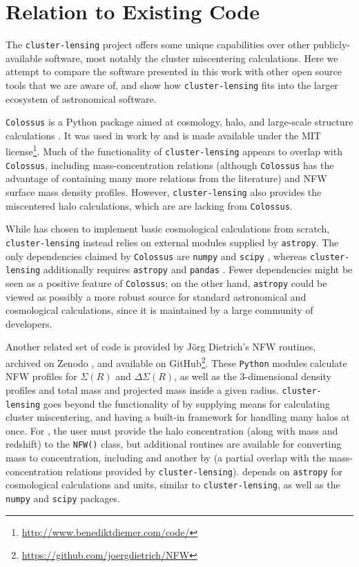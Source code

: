 \documentclass[twocolumn]{aastex6}
\newcommand{\code}{\lstinline[style=codeintext]}
\begin{document}
\section{Relation to Existing Code}

The \code{cluster-lensing} project offers some unique capabilities over other publicly-available software, most notably the cluster miscentering calculations. Here we attempt to compare the software presented in this work with other open source tools that we are aware of, and show how \code{cluster-lensing} fits into the larger ecosystem of astronomical software.

\code{Colossus} is a Python package aimed at cosmology, halo, and large-scale structure calculations \citep{ColossusCode}. It was used in work by \citet{Diemer15} and is made available under the MIT license\footnote{\url{http://www.benediktdiemer.com/code/}}. Much of the functionality of \code{cluster-lensing} appears to overlap with \code{Colossus}, including mass-concentration relations (although \code{Colossus} has the advantage of containing many more relations from the literature) and NFW surface mass density profiles. However, \code{cluster-lensing} also provides the miscentered halo calculations, which are are lacking from \code{Colossus}.

While \citet{ColossusCode} has chosen to implement basic cosmological calculations from scratch, \code{cluster-lensing} instead relies on external modules supplied by \code{astropy}.  The only dependencies claimed by \code{Colossus} are \code{numpy} \citep{NumPy} and \code{scipy} \citep{SciPy}, whereas \code{cluster-lensing} additionally requires \code{astropy} \citep{astropy13} and \code{pandas} \citep{Pandas}. Fewer dependencies might be seen as a positive feature of \code{Colossus}; on the other hand, \code{astropy} could be viewed as possibly a more robust source for standard astronomical and cosmological calculations, since it is maintained by a large community of developers.

Another related set of code is provided by J\"{o}rg Dietrich's NFW routines, archived on Zenodo \citep{DietrichNFW}, and available on GitHub\footnote{\url{https://github.com/joergdietrich/NFW}}. These \code{Python} modules calculate NFW profiles for $\Sigma(R)$ and $\Delta\Sigma(R)$, as well as the 3-dimensional density profiles and total mass and projected mass inside a given radius. \code{cluster-lensing} goes beyond the functionality of \citet{DietrichNFW} by supplying means for calculating cluster miscentering, and having a built-in framework for handling many halos at once. For \citet{DietrichNFW}, the user must provide the halo concentration (along with mass and redshift) to the \code{NFW()} class, but additional routines are available for converting mass to concentration, including \citet{Duffy08} and another by \citet{Dolag04} (a partial overlap with the mass-concentration relations provided by \code{cluster-lensing}). \citet{DietrichNFW} depends on \code{astropy} for cosmological calculations and units, similar to \code{cluster-lensing}, as well as the \code{numpy} and \code{scipy} packages.
\end{document}
